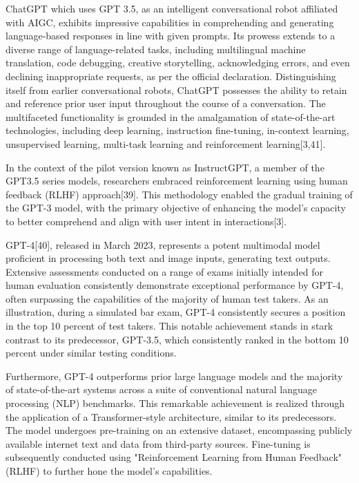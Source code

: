 \documentclass[conference]{IEEEtran}
\begin{document}
ChatGPT which uses GPT 3.5, as an intelligent conversational robot affiliated with AIGC, exhibits impressive capabilities in comprehending and generating language-based responses in line with given prompts. Its prowess extends to a diverse range of language-related tasks, including multilingual machine translation, code debugging, creative storytelling, acknowledging errors, and even declining inappropriate requests, as per the official declaration. Distinguishing itself from earlier conversational robots, ChatGPT possesses the ability to retain and reference prior user input throughout the course of a conversation. The multifaceted functionality is grounded in the amalgamation of state-of-the-art technologies, including deep learning, instruction fine-tuning, in-context learning, unsupervised learning, multi-task learning and reinforcement learning[3,41].

In the context of the pilot version known as InstructGPT, a member of the GPT3.5 series models, researchers embraced reinforcement learning using human feedback (RLHF) approach[39]. This methodology enabled the gradual training of the GPT-3 model, with the primary objective of enhancing the model's capacity to better comprehend and align with user intent in interactions[3].

GPT-4[40], released in March 2023, represents a potent multimodal model proficient in processing both text and image inputs, generating text outputs. Extensive assessments conducted on a range of exams initially intended for human evaluation consistently demonstrate exceptional performance by GPT-4, often surpassing the capabilities of the majority of human test takers. As an illustration, during a simulated bar exam, GPT-4 consistently secures a position in the top 10 percent of test takers. This notable achievement stands in stark contrast to its predecessor, GPT-3.5, which consistently ranked in the bottom 10 percent under similar testing conditions.

Furthermore, GPT-4 outperforms prior large language models and the majority of state-of-the-art systems across a suite of conventional natural language processing (NLP) benchmarks. This remarkable achievement is realized through the application of a Transformer-style architecture, similar to its predecessors. The model undergoes pre-training on an extensive dataset, encompassing publicly available internet text and data from third-party sources. Fine-tuning is subsequently conducted using "Reinforcement Learning from Human Feedback" (RLHF) to further hone the model's capabilities.
\end{document}
